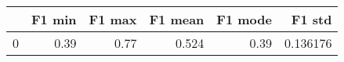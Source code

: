 \begin{tabular}{lrrrrr}
\toprule
{} &  F1 min &  F1 max &  F1 mean &  F1 mode &    F1 std \\
\midrule
0 &    0.39 &    0.77 &    0.524 &     0.39 &  0.136176 \\
\bottomrule
\end{tabular}
